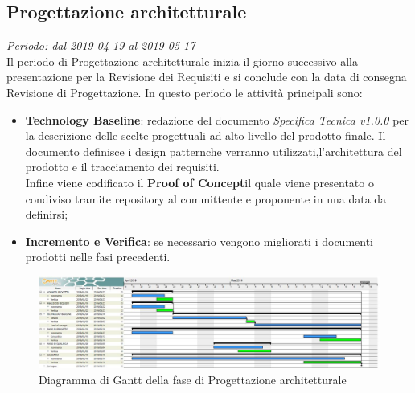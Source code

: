 \subsection{Progettazione architetturale}
\textit{Periodo: dal 2019-04-19 al 2019-05-17} \\
Il periodo di Progettazione architetturale inizia il giorno successivo alla presentazione per la Revisione dei Requisiti e si conclude con la data di consegna Revisione di 
Progettazione. In questo periodo le attività principali sono:
\begin{itemize}
	\item \textbf{Technology Baseline}: redazione del documento \textit{Specifica Tecnica v1.0.0} per la descrizione delle scelte progettuali ad alto livello del prodotto finale.
	Il documento definisce i design pattern\glosp che verranno utilizzati,l'architettura del prodotto e il tracciamento dei requisiti.\\
	Infine viene codificato il \textbf{Proof of Concept}\glosp il 
	quale viene presentato o condiviso tramite repository al committente e 
	proponente in una data da definirsi;
	\item \textbf{Incremento e Verifica}: se necessario vengono migliorati i 
	documenti prodotti nelle fasi precedenti.
\end{itemize}

\begin{figure}[H]
	\includegraphics[width=0.99\linewidth]{res/images/gantt_pa.jpg}
	\caption{Diagramma di Gantt della fase di Progettazione architetturale}
\end{figure}


